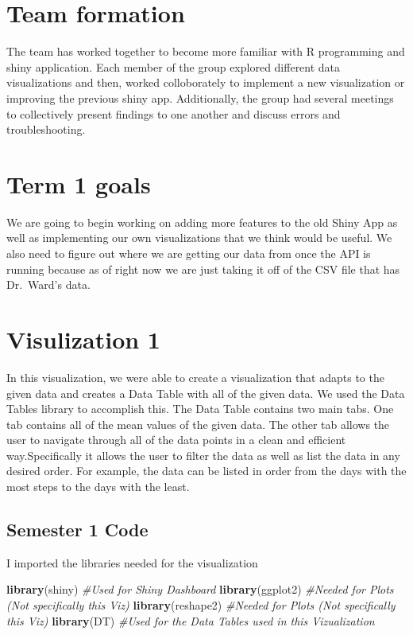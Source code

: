 \documentclass[]{book}
\newenvironment{Shaded}{\begin{snugshade}}{\end{snugshade}}
\newcommand{\KeywordTok}[1]{\textcolor[rgb]{0.13,0.29,0.53}{\textbf{#1}}}
\newcommand{\CommentTok}[1]{\textcolor[rgb]{0.56,0.35,0.01}{\textit{#1}}}
\newcommand{\NormalTok}[1]{#1}
\begin{document}
\section{Team formation}\label{team-formation}

The team has worked together to become more familiar with R programming
and shiny application. Each member of the group explored different data
visualizations and then, worked colloborately to implement a new
visualization or improving the previous shiny app. Additionally, the
group had several meetings to collectively present findings to one
another and discuss errors and troubleshooting.

\section{Term 1 goals}\label{term-1-goals}

We are going to begin working on adding more features to the old Shiny
App as well as implementing our own visualizations that we think would
be useful. We also need to figure out where we are getting our data from
once the API is running because as of right now we are just taking it
off of the CSV file that has Dr.~Ward's data.

\section{Visulization 1}\label{visulization-1}

In this visualization, we were able to create a visualization that
adapts to the given data and creates a Data Table with all of the given
data. We used the Data Tables library to accomplish this. The Data Table
contains two main tabs. One tab contains all of the mean values of the
given data. The other tab allows the user to navigate through all of the
data points in a clean and efficient way.Specifically it allows the user
to filter the data as well as list the data in any desired order. For
example, the data can be listed in order from the days with the most
steps to the days with the least.

\subsection{Semester 1 Code}\label{semester-1-code}

I imported the libraries needed for the visualization

\begin{Shaded}
\begin{Highlighting}[]
\KeywordTok{library}\NormalTok{(shiny) }\CommentTok{#Used for Shiny Dashboard}
\KeywordTok{library}\NormalTok{(ggplot2) }\CommentTok{#Needed for Plots (Not specifically this Viz)}
\KeywordTok{library}\NormalTok{(reshape2) }\CommentTok{#Needed for Plots (Not specifically this Viz)}
\KeywordTok{library}\NormalTok{(DT) }\CommentTok{#Used for the Data Tables used in this Vizualization}
\end{Highlighting}
\end{Shaded}
\end{document}
